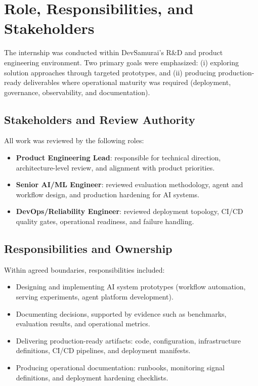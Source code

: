 \section{Role, Responsibilities, and Stakeholders}
\label{sec:OrgProfile_Role}

The internship was conducted within DevSamurai's R\&D and product engineering environment. Two primary goals were emphasized: (i) exploring solution approaches through targeted prototypes, and (ii) producing production-ready deliverables where operational maturity was required (deployment, governance, observability, and documentation).

\subsection{Stakeholders and Review Authority}
\label{subsec:OrgProfile_Stakeholders}

All work was reviewed by the following roles:

\begin{itemize}
    \item \textbf{Product Engineering Lead}: responsible for technical direction, architecture-level review, and alignment with product priorities.
    \item \textbf{Senior AI/ML Engineer}: reviewed evaluation methodology, agent and workflow design, and production hardening for AI systems.
    \item \textbf{DevOps/Reliability Engineer}: reviewed deployment topology, CI/CD quality gates, operational readiness, and failure handling.
\end{itemize}

\subsection{Responsibilities and Ownership}
\label{subsec:OrgProfile_Ownership}

Within agreed boundaries, responsibilities included:

\begin{itemize}
    \item Designing and implementing AI system prototypes (workflow automation, serving experiments, agent platform development).
    \item Documenting decisions, supported by evidence such as benchmarks, evaluation results, and operational metrics.
    \item Delivering production-ready artifacts: code, configuration, infrastructure definitions, CI/CD pipelines, and deployment manifests.
    \item Producing operational documentation: runbooks, monitoring signal definitions, and deployment hardening checklists.
\end{itemize}

